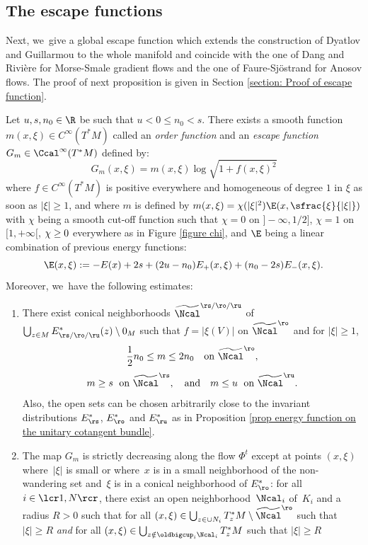 \subsection{The escape functions}

Next, we~give a global escape function which extends the construction of Dyatlov and Guillarmou \cite{dyatlov-guillarmou_2016} to the whole manifold and coincide with the one of Dang and Rivière \cite{DR0} for Morse-Smale gradient flows and the one of Faure-Sjöstrand \cite{FS} for Anosov flows. The proof of next proposition is given in Section \ref{section: Proof of escape function}.

\begin{prop}\label{prop escape function}
Let $u,s,n_0 \in \R$ be such that $u < 0 \leq n_0 < s$. There exists a smooth function $m(x,\xi) \in C^{\infty} (T^* M)$ called an \emph{order function} and an \emph{escape function} $G_m \in \Ccal^{\infty} (T^*M)$ defined by:
\[
G_{m} (x, \xi) = m(x, \xi) \log \sqrt{1 + f(x,\xi)^2}
\]
where $f \in C^{\infty}(T^* M)$ is positive everywhere and homogeneous of degree $1$ in $\xi$ as soon as $|\xi| \geq 1$, and where $m$ is defined by $m(x,\xi) = \chi (|\xi|^2) \E(x,\sfrac{\xi}{|\xi|})$ with $\chi$ being a smooth cut-off function such that $\chi = 0$ on $]-\infty, 1/2]$, $\chi = 1$ on $[1,+\infty[$, $\chi \geq\nobreak 0$ everywhere as in Figure \ref{figure chi}, and $\E$ being a linear combination of previous energy functions:
\[
\E (x,\xi):= -E(x) + 2s + (2u - n_0) E_+ (x,\xi) + (n_0 - 2s) E_- (x,\xi).
\]
Moreover, we~have the following estimates:
\begin{enumerate}
\item\label{prop escape function1} There exist conical neighborhoods $\widetilde{\Ncal}^{\rs/\ro/\ru}$ of $\bigcup_{z \in M} E_{\rs/\ro/\ru}^* (z) \setminus 0_M$ such that $f = |\xi(V)|$ on $\widetilde{\Ncal}^\ro$ and for $|\xi| \geq 1$,
\[
\frac{1}{2} n_0 \leq m \leq 2n_0 \quad\text{on } \widetilde{\Ncal}^{\ro},
\]
\[
m \geq s \;\text{ on } \widetilde{\Ncal}^{\rs}, \quad \text{and} \quad m \leq u \;\text{ on } \widetilde{\Ncal}^{\ru}.
\]
Also, the open sets can be chosen arbitrarily close to the invariant distributions $E_\rs^*$, $E_\ro^*$ and $E_\ru^*$ as in Proposition \ref{prop energy function on the unitary cotangent bundle}.
\item\label{prop escape function2} The map $G_m$ is strictly decreasing along the flow $\Phi^t$ except at points $(x,\xi)$ where~$|\xi|$ is small or where~$x$ is in a small neighborhood of the non-wandering set and~$\xi$ is in a conical neighborhood of $E_\ro^*$: for all $i\in\lcr1,N\rcr$, there exist an open neighborhood~$\Ncal_i$ of~$K_i$ and a radius $R > 0$ such that for all $(x,\xi)\in \bigcup_{z\in \cup N_i} T_z^*M\setminus \widetilde{\Ncal}^\ro$ such that $ |\xi| \geq R$ \emph{and} for all $(x,\xi) \in \bigcup_{z\notin \oldbigcup_i \Ncal_i} T_z^*M$ such that $ |\xi| \geq R$

\end{enumerate}
\end{prop}
